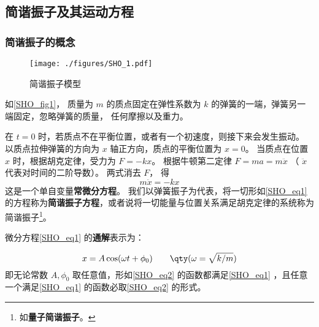 


\subsection{简谐振子及其运动方程}

\subsubsection{简谐振子的概念}

\begin{figure}[ht]
\centering
\texttt{[image: ./figures/SHO\_1.pdf]}
\caption{简谐振子模型} \label{SHO_fig1}
\end{figure}

如\autoref{SHO_fig1}， 质量为 $m$ 的质点固定在弹性系数为 $k$ 的弹簧的一端，弹簧另一端固定，忽略弹簧的质量， 任何摩擦以及重力。

在 $t = 0$ 时，若质点不在平衡位置，或者有一个初速度，则接下来会发生振动。 以质点拉伸弹簧的方向为 $x$ 轴正方向，质点的平衡位置为 $x = 0$。 当质点在位置 $x$ 时，根据胡克定律，受力为 $F =  - kx$。 根据牛顿第二定律 $F = ma = m\ddot x$ （ $\ddot x$ 代表对时间的二阶导数）。  两式消去 $F$， 得
\begin{equation}\label{SHO_eq1}
m\ddot x =  - kx
\end{equation}
这是一个单自变量\textbf{常微分方程}。 我们以弹簧振子为代表，将一切形如\autoref{SHO_eq1} 的方程称为\textbf{简谐振子方程}，或者说将一切能量与位置关系满足胡克定律的系统称为简谐振子\footnote{如\textbf{量子简谐振子}。}。




微分方程\autoref{SHO_eq1} 的\textbf{通解}表示为：

\begin{equation}\label{SHO_eq2}
x = A\cos(\omega t + \phi_0)  \qquad \qty(\omega  = \sqrt{k/m})
\end{equation}
即无论常数 $A, \phi_0$ 取任意值，形如\autoref{SHO_eq2} 的函数都满足\autoref{SHO_eq1} ，且任意一个满足\autoref{SHO_eq1} 的函数必取\autoref{SHO_eq2} 的形式。

